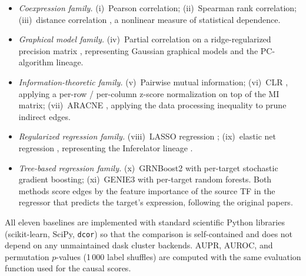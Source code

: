 \documentclass[10pt,letterpaper]{article}
\begin{document}
\begin{itemize}[leftmargin=1.5em]
\item \textit{Coexpression family.}
      (i)~Pearson correlation;
      (ii)~Spearman rank correlation;
      (iii)~distance correlation \cite{szekely_distance_correlation_2007},
      a nonlinear measure of statistical dependence.
\item \textit{Graphical model family.}
      (iv)~Partial correlation on a ridge-regularized precision matrix
      \cite{pearl_causality_2009}, representing Gaussian graphical models
      and the PC-algorithm lineage.
\item \textit{Information-theoretic family.}
      (v)~Pairwise mutual information;
      (vi)~CLR \cite{faith_clr_2007}, applying a per-row / per-column
      z-score normalization on top of the MI matrix;
      (vii)~ARACNE \cite{margolin_aracne_2006}, applying the data
      processing inequality to prune indirect edges.
\item \textit{Regularized regression family.}
      (viii)~LASSO regression \cite{tibshirani_lasso_1996};
      (ix)~elastic net regression \cite{zou_elasticnet_2005},
      representing the Inferelator lineage
      \cite{bonneau_grn_review_2007,gibbs_inferelator3_2022}.
\item \textit{Tree-based regression family.}
      (x)~GRNBoost2 \cite{moerman_grnboost2_2019} with per-target
      stochastic gradient boosting;
      (xi)~GENIE3 \cite{huynhthu_genie3_2010} with per-target random
      forests. Both methods score edges by the feature importance of
      the source TF in the regressor that predicts the target's
      expression, following the original papers.
\end{itemize}

All eleven baselines are implemented with standard scientific Python
libraries (scikit-learn, SciPy, \texttt{dcor}) so that the comparison is
self-contained and does not depend on any unmaintained dask cluster
backends. AUPR, AUROC, and permutation $p$-values (1\,000 label shuffles)
are computed with the same evaluation function used for the causal
scores.
\end{document}
